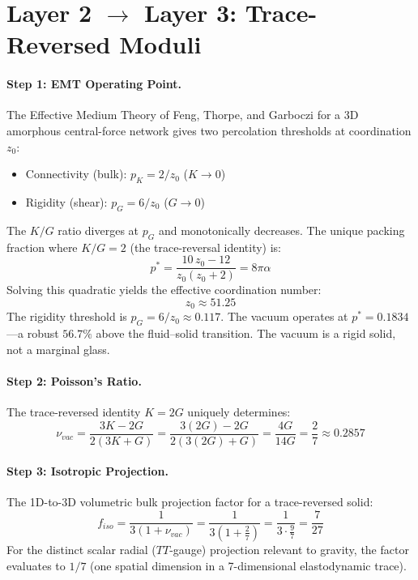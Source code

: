 \section{Layer 2 $\to$ Layer 3: Trace-Reversed Moduli}
\label{sec:layer23}

\paragraph{Step 1: EMT Operating Point.}
The Effective Medium Theory of Feng, Thorpe, and Garboczi for a 3D amorphous
central-force network gives two percolation thresholds at coordination $z_0$:
\begin{itemize}
    \item Connectivity (bulk): $p_K = 2/z_0$ \quad ($K \to 0$)
    \item Rigidity (shear): $p_G = 6/z_0$ \quad ($G \to 0$)
\end{itemize}
The $K/G$ ratio diverges at $p_G$ and monotonically decreases. The unique
packing fraction where $K/G = 2$ (the trace-reversal identity) is:
\begin{equation}
    p^* = \frac{10\,z_0 - 12}{z_0(z_0 + 2)} = 8\pi\alpha
    \label{eq:EMT_operating_point}
\end{equation}
Solving this quadratic yields the effective coordination number:
\begin{equation}
    z_0 \approx 51.25
    \label{eq:z0}
\end{equation}
The rigidity threshold is $p_G = 6/z_0 \approx 0.117$. The vacuum operates at
$p^* = 0.1834$---a robust $56.7\%$ above the fluid--solid transition. The
vacuum is a rigid solid, not a marginal glass.

\paragraph{Step 2: Poisson's Ratio.}
The trace-reversed identity $K = 2G$ uniquely determines:
\begin{equation}
    \nu_{vac}
    = \frac{3K - 2G}{2(3K + G)}
    = \frac{3(2G) - 2G}{2(3(2G) + G)}
    = \frac{4G}{14G}
    = \boxed{\frac{2}{7}}
    \approx 0.2857
    \label{eq:nu_vac}
\end{equation}

\paragraph{Step 3: Isotropic Projection.}
The 1D-to-3D volumetric bulk projection factor for a trace-reversed solid:
\begin{equation}
    f_{iso} = \frac{1}{3(1 + \nu_{vac})}
    = \frac{1}{3\!\left(1 + \frac{2}{7}\right)}
    = \frac{1}{3 \cdot \frac{9}{7}}
    = \frac{7}{27}
\end{equation}
For the distinct scalar radial ($TT$-gauge) projection relevant to gravity,
the factor evaluates to $1/7$ (one spatial dimension in a 7-dimensional
elastodynamic trace).

